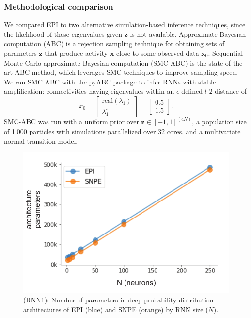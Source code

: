 \documentclass[11pt]{article}
\begin{document}
\subsubsection{Methodological comparison}
We compared EPI to two alternative simulation-based inference techniques, since the likelihood of these eigenvalues given $\mathbf{z}$ is not available.
Approximate Bayesian computation (ABC) \cite{beaumont2002approximate} is a rejection sampling technique for obtaining sets of parameters $\mathbf{z}$ that produce activity $\mathbf{x}$ close to some observed data $\mathbf{x}_0$.
Sequential Monte Carlo approximate Bayesian computation (SMC-ABC) is the state-of-the-art ABC method, which leverages SMC techniques to improve sampling speed.
We ran SMC-ABC with the pyABC package \cite{klinger2018pyabc} to infer RNNs with stable amplification: connectivities having eigenvalues within an $\epsilon$-defined $l$-$2$ distance of
\begin{equation}\label{eq:stab_amp_x0}
x_0 = \begin{bmatrix} \text{real}(\lambda_1) \\ \lambda^s_1 \end{bmatrix} = \begin{bmatrix} 0.5 \\ 1.5 \end{bmatrix}.
\end{equation}
SMC-ABC was run with a uniform prior over $\mathbf{z} \in \left[-1, 1 \right]^{(4N)}$, a population size of 1,000 particles with simulations parallelized over 32 cores, and a multivariate normal transition model.

\begin{figure}
\begin{center}
\includegraphics[scale=0.7]{figures/figRNN1/figRNN1.pdf}
\end{center}
\caption{\small (RNN1): 
Number of parameters in deep probability distribution architectures of EPI (blue) and SNPE (orange) by RNN size ($N$).
}
\label{fig:RNN1}
\end{figure}
\end{document}
